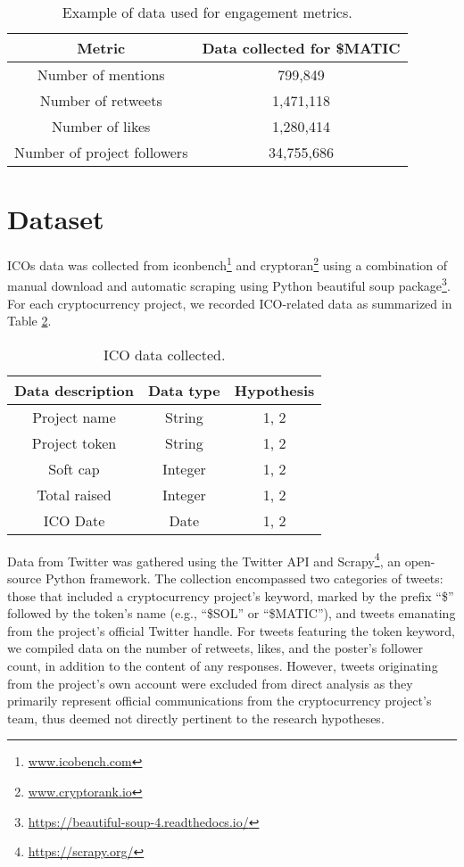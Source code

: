\documentclass[runningheads]{llncs}
\begin{document}
\begin{table}[htbp]
\caption{Example of data used for engagement metrics.}
\begin{center}
\begin{tabular}{|c|c|}
\hline
\textbf{Metric} & \textbf{Data collected for \$MATIC} \\
\hline
Number of mentions & 799,849 \\
\hline
Number of retweets & 1,471,118 \\
\hline
Number of likes & 1,280,414 \\
\hline
Number of project followers & 34,755,686 \\
\hline
\end{tabular}
\label{tab2}
\end{center}
\end{table}

\section{Dataset}

ICOs data was collected from iconbench\footnote{\url{www.icobench.com}} and cryptoran\footnote{\url{www.cryptorank.io}} using a combination of manual download and automatic scraping using Python beautiful soup package\footnote{\url{https://beautiful-soup-4.readthedocs.io/}}. For each cryptocurrency project, we recorded ICO-related data as summarized in Table \ref{tab3}.

\begin{table}[htbp]
\caption{ICO data collected.}
\begin{center}
\begin{tabular}{|c|c|c|}
\hline
\textbf{Data description} & \textbf{Data type} & \textbf{Hypothesis} \\
\hline
Project name & String & 1, 2 \\
\hline
Project token & String & 1, 2 \\
\hline
Soft cap & Integer & 1, 2 \\
\hline
Total raised & Integer & 1, 2 \\
\hline
ICO Date & Date & 1, 2 \\
\hline
\end{tabular}
\label{tab3}
\end{center}
\end{table}


Data from Twitter was gathered using the Twitter API and Scrapy\footnote{\url{https://scrapy.org/}}, an open-source Python framework. The collection encompassed two categories of tweets: those that included a cryptocurrency project's keyword, marked by the prefix ``\$'' followed by the token's name (e.g., ``\$SOL'' or ``\$MATIC''), and tweets emanating from the project's official Twitter handle. For tweets featuring the token keyword, we compiled data on the number of retweets, likes, and the poster's follower count, in addition to the content of any responses. However, tweets originating from the project’s own account were excluded from direct analysis as they primarily represent official communications from the cryptocurrency project's team, thus deemed not directly pertinent to the research hypotheses.
\end{document}

